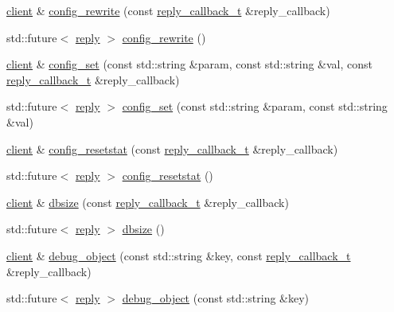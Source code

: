 \begin{DoxyCompactItemize}
\item 
\hyperlink{classcpp__redis_1_1client}{client} \& \hyperlink{classcpp__redis_1_1client_a8dcf862a8a0cb75f8cc986445eae81cf}{config\+\_\+rewrite} (const \hyperlink{classcpp__redis_1_1client_a061a1140d36d2eaeda82b09a0bb3f9f2}{reply\+\_\+callback\+\_\+t} \&reply\+\_\+callback)
\item 
std\+::future$<$ \hyperlink{classcpp__redis_1_1reply}{reply} $>$ \hyperlink{classcpp__redis_1_1client_a1a001663bd555abb70521924ec2a27f8}{config\+\_\+rewrite} ()
\item 
\hyperlink{classcpp__redis_1_1client}{client} \& \hyperlink{classcpp__redis_1_1client_a0cff7147cd982a39cc84f91243a27364}{config\+\_\+set} (const std\+::string \&param, const std\+::string \&val, const \hyperlink{classcpp__redis_1_1client_a061a1140d36d2eaeda82b09a0bb3f9f2}{reply\+\_\+callback\+\_\+t} \&reply\+\_\+callback)
\item 
std\+::future$<$ \hyperlink{classcpp__redis_1_1reply}{reply} $>$ \hyperlink{classcpp__redis_1_1client_a8fdeb462b43ea6f5199145696713f9b1}{config\+\_\+set} (const std\+::string \&param, const std\+::string \&val)
\item 
\hyperlink{classcpp__redis_1_1client}{client} \& \hyperlink{classcpp__redis_1_1client_a4b1361aa6c997b76a059c144a302b5be}{config\+\_\+resetstat} (const \hyperlink{classcpp__redis_1_1client_a061a1140d36d2eaeda82b09a0bb3f9f2}{reply\+\_\+callback\+\_\+t} \&reply\+\_\+callback)
\item 
std\+::future$<$ \hyperlink{classcpp__redis_1_1reply}{reply} $>$ \hyperlink{classcpp__redis_1_1client_a775508ce5220546e46b573f95d2bcb4d}{config\+\_\+resetstat} ()
\item 
\hyperlink{classcpp__redis_1_1client}{client} \& \hyperlink{classcpp__redis_1_1client_a87a8351f0a6927db52b4ab2a5b9192c9}{dbsize} (const \hyperlink{classcpp__redis_1_1client_a061a1140d36d2eaeda82b09a0bb3f9f2}{reply\+\_\+callback\+\_\+t} \&reply\+\_\+callback)
\item 
std\+::future$<$ \hyperlink{classcpp__redis_1_1reply}{reply} $>$ \hyperlink{classcpp__redis_1_1client_aa9169c3c4a8b3ec5ee7b7bc601ae8a52}{dbsize} ()
\item 
\hyperlink{classcpp__redis_1_1client}{client} \& \hyperlink{classcpp__redis_1_1client_ad96e4d369e87e858fd7a8296b5cc378e}{debug\+\_\+object} (const std\+::string \&key, const \hyperlink{classcpp__redis_1_1client_a061a1140d36d2eaeda82b09a0bb3f9f2}{reply\+\_\+callback\+\_\+t} \&reply\+\_\+callback)
\item 
std\+::future$<$ \hyperlink{classcpp__redis_1_1reply}{reply} $>$ \hyperlink{classcpp__redis_1_1client_a9d7a2eae091f99db6b5479577de0bf99}{debug\+\_\+object} (const std\+::string \&key)

\end{DoxyCompactItemize}

